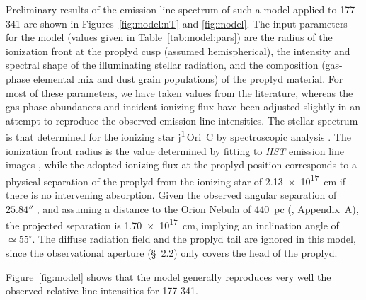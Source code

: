 \documentclass[useAMS,usenatbib]{mn2e}
\newcommand{\texttheta}{\greektext j\latintext}
\newcommand\thC{\texttheta\textsuperscript{1}\,Ori~C}
\begin{document}
Preliminary results of the emission line spectrum of such a model applied to 177-341 are shown in Figures~\ref{fig:model:nT} and \ref{fig:model}.  
The input parameters for the model (values given in Table~\ref{tab:model:pars}) are the radius of the ionization front at the proplyd cusp (assumed hemispherical), the intensity and spectral shape of the illuminating stellar radiation, and the composition (gas-phase elemental mix and dust grain populations) of the proplyd material.
For most of these parameters, we have taken values from the literature, whereas the gas-phase abundances and incident ionizing flux have been adjusted slightly in an attempt to reproduce the observed emission line intensities. 
The stellar spectrum is that determined for the ionizing star \thC{} by spectroscopic analysis \citep{2006AandA...448..351S}. 
The ionization front radius is the value determined by fitting to \textit{HST} emission line images \citep{1999AJ....118.2350H}, while the adopted ionizing flux at the proplyd position corresponds to a physical separation of the proplyd from the ionizing star of \SI{2.13e17}{cm} if there is no intervening absorption.
Given the observed angular separation of \(25.84''\) \citep{1998AJ....116..293B}, and assuming a distance to the Orion Nebula of 440~pc (\citealp{2008AJ....136.1566O}, Appendix~A), the projected separation is \SI{1.70e17}{cm}, implying an inclination angle of \(\simeq 55^\circ\). 
The diffuse radiation field and the proplyd tail are ignored in this model, since the observational aperture (\S~2.2) only covers the head of the proplyd. 

Figure~\ref{fig:model} shows that the model generally reproduces very well the observed relative line intensities for 177-341.  
\end{document}
